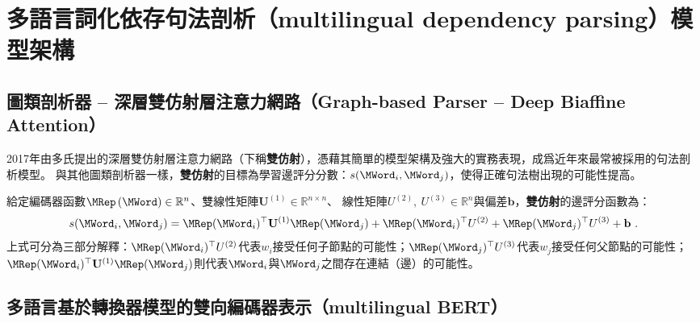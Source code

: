 \label{chapter:lex_parsing}
\section{多語言詞化依存句法剖析（multilingual dependency parsing）模型架構}
\subsection{圖類剖析器 -- 深層雙仿射層注意力網路（Graph-based Parser -- Deep Biaffine Attention）}

2017年由多氏\cite{Dozat2017DeepBA}提出的深層雙仿射層注意力網路（下稱\textbf{雙仿射}），憑藉其簡單的模型架構及強大的實務表現，成爲近年來最常被採用的句法剖析模型。
與其他圖類剖析器一樣，\textbf{雙仿射}的目標為學習邊評分分數：$s(\MWord_{i}, \MWord_{j})$，使得正確句法樹出現的可能性提高。

給定編碼器函數$\MRep\left(\MWord\right) \in \mathbb{R}^{n}$、雙線性矩陣$\mathbf{U}^{(1)} \in \mathbb{R}^{n \times n}$、
線性矩陣$U^{(2)},\ U^{(3)} \in \mathbb{R}^{n} $與偏差$\mathbf{b}$，\textbf{雙仿射}的邊評分函數為：
\begin{equation}
    s(\MWord_{i}, \MWord_{j}) = \MRep(\MWord_{i})^{\top} \mathbf{U}^{(1)} \MRep(\MWord_{j}) + \MRep(\MWord_{i})^{\top} U^{(2)} + \MRep(\MWord_{j})^{\top} U^{(3)} + \mathbf{b}\ .
\end{equation}
上式可分為三部分解釋：$\MRep(\MWord_{i})^{\top} U^{(2)}$代表$w_{i}$接受任何子節點的可能性；$\MRep(\MWord_{j})^{\top} U^{(3)}$代表$w_{j}$接受任何父節點的可能性；
$\MRep(\MWord_{i})^{\top} \mathbf{U}^{(1)} \MRep(\MWord_{j})$則代表$\MWord_{i}$與$\MWord_{j}$之間存在連結（邊）的可能性。

\subsection{多語言基於轉換器模型的雙向編碼器表示（multilingual BERT）}

